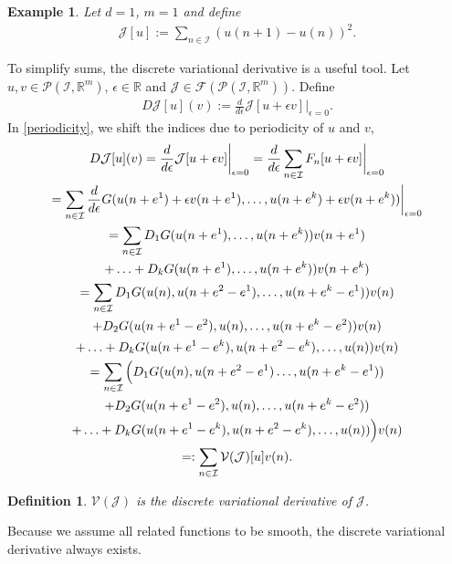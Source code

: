 \documentclass[sigconf,twocolumn]{acmart}
\newcommand{\Rr}{{\mathbb{R}}}
\newcommand{\1}{{\chi}}
\newcommand{\Ii}{{\mathcal{I}}}
\numberwithin{equation}{section}
\theoremstyle{thmlemcorr}
\numberwithin{theorem}{section}
\theoremstyle{thmlemcorr*}
\theoremstyle{defi}
\newtheorem{definition}[theorem]{Definition}
\theoremstyle{remexample}
\newtheorem{example}[theorem]{Example}
\theoremstyle{ass}
\begin{document}
\begin{example}
	\label{functional1}
	Let $d=1$, $m=1$ and define
	\begin{gather*}
		\mathcal{J}[u]:=\sum_{n\in\Ii}(u(n+1)-u(n))^2.
	\end{gather*}
\end{example}
To simplify sums, the discrete variational derivative is a useful tool.
Let $u,v\in\mathcal{P}(\Ii,\Rr^m)$, $\epsilon 
	\in\Rr$ and $\mathcal{J}\in\mathcal{F}(\mathcal{P}(\Ii,\Rr^m))$. Define
	\begin{gather*}
		D\mathcal{J}[u](v):=\frac{d}{d\epsilon}\mathcal{J}[u+\epsilon v]\bigg|_{\epsilon=0}.
	\end{gather*}
	In \eqref{periodicity}, we shift the indices due to periodicity of $u$ and $v$,
	\begin{gather}
	\notag	D\mathcal{J}[u](v)=\frac{d}{d\epsilon}\mathcal{J}[u+\epsilon v]\bigg|_{\epsilon=0}=\frac{d}{d\epsilon}\sum_{n\in\Ii}F_n[u+\epsilon v]\bigg|_{\epsilon=0}\\
	\notag	=\sum_{n\in\Ii}\frac{d}{d\epsilon}G(u(n+e^1)+\epsilon v(n+e^1),\ldots,u(n+e^k)+\epsilon v(n+e^k))\bigg|_{\epsilon=0}\\
	\notag	=\sum_{n\in\Ii}D_1G(u(n+e^1),\ldots,u(n+e^k))v(n+e^1)\\
	\notag	+\ldots+D_kG(u(n+e^1),\ldots,u(n+e^k))v(n+e^k)\\
	\label{periodicity}	=\sum_{n\in\Ii}D_1G(u(n),u(n+e^2-e^1),\ldots,u(n+e^k-e^1))v(n)\\
	\notag	+D_2G(u(n+e^1-e^2),u(n),\ldots,u(n+e^k-e^2))v(n)\\
	\notag	+\ldots+D_kG(u(n+e^1-e^k),u(n+e^2-e^k),\ldots,u(n))v(n)\\
	\notag	=\sum_{n\in\Ii}\Big(D_1G(u(n),u(n+e^2-e^1)\ldots,u(n+e^k-e^1))\\
	\notag	+D_2G(u(n+e^1-e^2),u(n),\ldots,u(n+e^k-e^2))\\
	\notag	+\ldots+D_kG(u(n+e^1-e^k),u(n+e^2-e^k),\ldots,u(n))\Big)v(n)\\
	\notag	=:\sum_{n\in\Ii}\mathcal{V}(\mathcal{J})[u]v(n).	
	\end{gather}
\begin{definition}
$\mathcal{V}(\mathcal{J})$ is the discrete variational derivative of $\mathcal{J}$.
\end{definition}
Because we assume all related functions to be smooth, the discrete variational derivative always exists.
\end{document}
